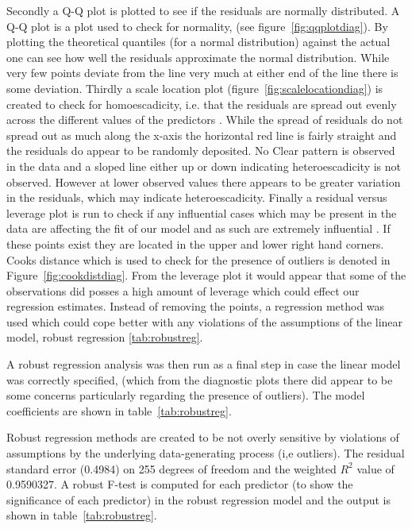 Secondly a Q-Q plot is plotted to see if the residuals are normally distributed. A Q-Q plot is a plot used to check for normality, (see figure~\ref{fig:qqplotdiag}). By plotting the theoretical quantiles (for a normal distribution) against the actual one can see how well the residuals approximate the normal distribution. While very few points deviate from the line very much at either end of the line there is some deviation. Thirdly a scale location plot (figure~\ref{fig:scalelocationdiag}) is created to check for homoescadicity, i.e. that the residuals are spread out evenly across the different values of the predictors \citep{neter1996applied}. While the spread of residuals do not  spread out as much along the x-axis the horizontal red line is fairly straight and the residuals do appear to be randomly deposited. No Clear pattern is observed in the data and a sloped line either up or down indicating heteroescadicity is not observed. However at lower observed values there appears to be greater variation in the residuals, which may indicate heteroescadicity. Finally a residual versus leverage plot is run to check if any influential cases which may be present in the data are affecting the fit of our model and as such are extremely influential \citep{sall1990leverage}. If these points exist they are located in the upper and lower right hand corners. Cooks distance \citep{chatterjee2009sensitivity} which is used to check for the presence of outliers is denoted in Figure~\ref{fig:cookdistdiag}. From the leverage plot it would appear that some of the observations did posses a high amount of leverage which could effect our regression estimates. Instead of removing the points, a regression method was used which could cope better with any violations of the assumptions of the linear model, robust regression \ref{tab:robustreg}.

A robust regression analysis \citep{rousseeuw2005robust} was then run as a final step in case the linear model was correctly specified, (which from the diagnostic plots there did appear to be some concerns particularly regarding the presence of outliers). The model coefficients are shown in table~\ref{tab:robustreg}. 

Robust regression methods are created to be not overly sensitive by violations of assumptions by the underlying data-generating process (i,e outliers). The residual standard error (0.4984) on 255 degrees of freedom and the weighted $R^2$ value of 0.9590327. A robust F-test is computed for each predictor (to show the significance of each predictor) in the robust regression model and the output is shown in table~\ref{tab:robustreg}.

